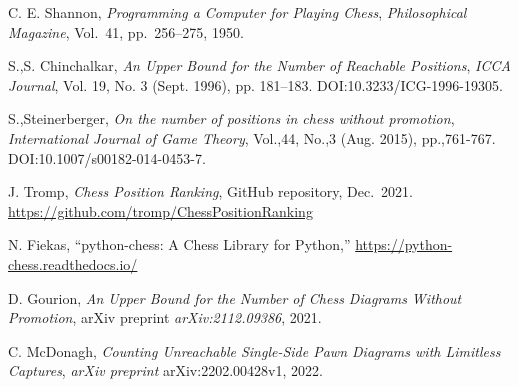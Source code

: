 \documentclass[12pt]{article}
\begin{document}
\begin{thebibliography}{9}

C. E. Shannon, \emph{Programming a Computer for Playing Chess}, 
\textit{Philosophical Magazine}, Vol.~41, pp.~256–275, 1950.

S.,S. Chinchalkar, \emph{An Upper Bound for the Number of Reachable Positions},
\textit{ICCA Journal}, Vol. 19, No. 3 (Sept. 1996), pp. 181–183. DOI:10.3233/ICG-1996-19305.

S.,Steinerberger, \emph{On the number of positions in chess without promotion},
\textit{International Journal of Game Theory}, Vol.,44, No.,3 (Aug. 2015), pp.,761-767. DOI:10.1007/s00182-014-0453-7. 

J. Tromp, \emph{Chess Position Ranking}, GitHub repository, Dec.~2021. 
\url{https://github.com/tromp/ChessPositionRanking}

N. Fiekas, “python-chess: A Chess Library for Python,” 
\url{https://python-chess.readthedocs.io/}

D. Gourion, \emph{An Upper Bound for the Number of Chess Diagrams Without Promotion}, 
arXiv preprint \textit{arXiv:2112.09386}, 2021.

C. McDonagh, \emph{Counting Unreachable Single-Side Pawn Diagrams with Limitless Captures}, 
\textit{arXiv preprint} arXiv:2202.00428v1, 2022.

\end{thebibliography}
\end{document}
